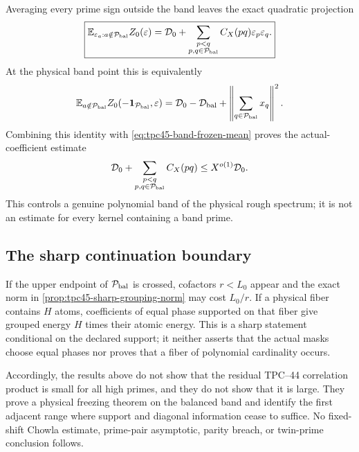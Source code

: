 Averaging every prime sign outside the band leaves the exact quadratic
projection
\begin{equation}
 \boxed{
 \mathbb E_{\varepsilon_a:a\notin\mathcal P_{\rm bal}}Z_0(\varepsilon)
 =\mathcal D_0+
  \sum_{\substack{p<q\\p,q\in\mathcal P_{\rm bal}}}
  C_X(pq)\varepsilon_p\varepsilon_q.}
 \label{eq:tpc45-exact-band-quadratic}
\end{equation}
At the physical band point this is equivalently
\begin{equation}
 \mathbb E_{a\notin\mathcal P_{\rm bal}}
 Z_0(-\mathbf 1_{\mathcal P_{\rm bal}},\varepsilon)
 =\mathcal D_0-\mathcal D_{\rm bal}
  +\left\|\sum_{q\in\mathcal P_{\rm bal}}x_q\right\|^2.
 \label{eq:tpc45-exact-band-Gram-collapse}
\end{equation}
Combining this identity with
\eqref{eq:tpc45-band-frozen-mean} proves the actual-coefficient estimate
\begin{equation}
 \mathcal D_0+
 \sum_{\substack{p<q\\p,q\in\mathcal P_{\rm bal}}}C_X(pq)
 \le X^{o(1)}\mathcal D_0.
 \label{eq:tpc45-pure-band-spectrum-bound}
\end{equation}
This controls a genuine polynomial band of the physical rough spectrum;
it is not an estimate for every kernel containing a band prime.

\subsection{The sharp continuation boundary}

If the upper endpoint of \(\mathcal P_{\rm bal}\) is crossed, cofactors
\(r<L_0\) appear and the exact norm in
\cref{prop:tpc45-sharp-grouping-norm} may cost \(L_0/r\).  If a physical
fiber contains \(H\) atoms, coefficients of equal phase supported on
that fiber give grouped energy \(H\) times their atomic energy.  This is
a sharp statement conditional on the declared support; it neither
asserts that the actual masks choose equal phases nor proves that a
fiber of polynomial cardinality occurs.

Accordingly, the results above do not show that the residual TPC--44
correlation product is small for all high primes, and they do not show
that it is large.  They prove a physical freezing theorem on the
balanced band and identify the first adjacent range where support and
diagonal information cease to suffice.  No fixed-shift Chowla estimate,
prime-pair asymptotic, parity breach, or twin-prime conclusion follows.
